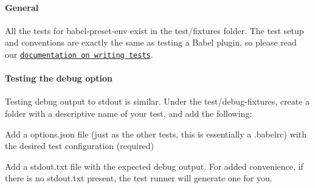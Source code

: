 \paragraph*{General}

All the tests for {\ttfamily babel-\/preset-\/env} exist in the {\ttfamily test/fixtures} folder. The test setup and conventions are exactly the same as testing a Babel plugin, so please read our \href{https://github.com/babel/babel/blob/master/CONTRIBUTING.md#babel-plugin-x}{\tt documentation on writing tests}.

\paragraph*{Testing the {\ttfamily debug} option}

Testing debug output to {\ttfamily stdout} is similar. Under the {\ttfamily test/debug-\/fixtures}, create a folder with a descriptive name of your test, and add the following\+:


\begin{DoxyItemize}
\item Add a {\ttfamily options.\+json} file (just as the other tests, this is essentially a {\ttfamily .babelrc}) with the desired test configuration (required)
\item Add a {\ttfamily stdout.\+txt} file with the expected debug output. For added convenience, if there is no {\ttfamily stdout.\+txt} present, the test runner will generate one for you. 
\end{DoxyItemize}